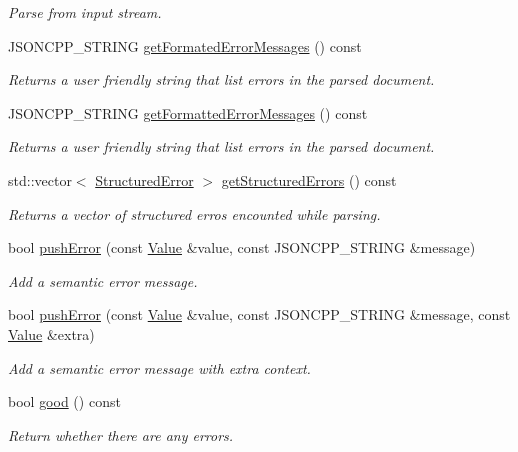 \begin{DoxyCompactItemize}
\begin{DoxyCompactList}\small\item\em Parse from input stream. \end{DoxyCompactList}\item 
J\+S\+O\+N\+C\+P\+P\+\_\+\+S\+T\+R\+I\+NG \hyperlink{classJson_1_1Reader_a791cbc5afd1bef1631e07239dc452c79}{get\+Formated\+Error\+Messages} () const
\begin{DoxyCompactList}\small\item\em Returns a user friendly string that list errors in the parsed document. \end{DoxyCompactList}\item 
J\+S\+O\+N\+C\+P\+P\+\_\+\+S\+T\+R\+I\+NG \hyperlink{classJson_1_1Reader_ae638a7b1f36f7ccf99ba89fa36ccf222}{get\+Formatted\+Error\+Messages} () const
\begin{DoxyCompactList}\small\item\em Returns a user friendly string that list errors in the parsed document. \end{DoxyCompactList}\item 
std\+::vector$<$ \hyperlink{structJson_1_1Reader_1_1StructuredError}{Structured\+Error} $>$ \hyperlink{classJson_1_1Reader_ae3d714e95bd98b27e296c607e408189b}{get\+Structured\+Errors} () const
\begin{DoxyCompactList}\small\item\em Returns a vector of structured erros encounted while parsing. \end{DoxyCompactList}\item 
bool \hyperlink{classJson_1_1Reader_af5fa7099083f01706635ade1d0f8ddb5}{push\+Error} (const \hyperlink{classJson_1_1Value}{Value} \&value, const J\+S\+O\+N\+C\+P\+P\+\_\+\+S\+T\+R\+I\+NG \&message)
\begin{DoxyCompactList}\small\item\em Add a semantic error message. \end{DoxyCompactList}\item 
bool \hyperlink{classJson_1_1Reader_a3568be9db568ff57bd3fcc373143dff3}{push\+Error} (const \hyperlink{classJson_1_1Value}{Value} \&value, const J\+S\+O\+N\+C\+P\+P\+\_\+\+S\+T\+R\+I\+NG \&message, const \hyperlink{classJson_1_1Value}{Value} \&extra)
\begin{DoxyCompactList}\small\item\em Add a semantic error message with extra context. \end{DoxyCompactList}\item 
bool \hyperlink{classJson_1_1Reader_a86cbb42b3e6d4a4d6416473b1a8f6ae7}{good} () const
\begin{DoxyCompactList}\small\item\em Return whether there are any errors. \end{DoxyCompactList}\end{DoxyCompactItemize}


